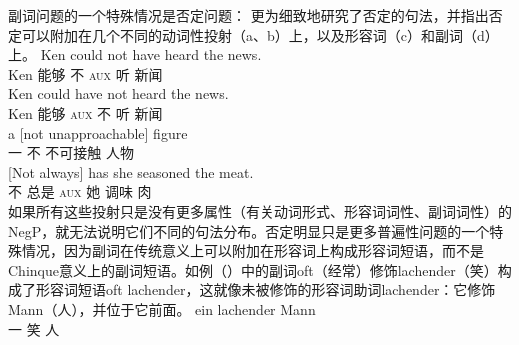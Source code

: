 副词问题的一个特殊情况是否定问题： \citet{Ernst92a}更为细致地研究了否定的句法，并指出否定可以附加在几个不同的动词性投射（a、b）上，以及形容词（c）和副词（d）上。
\eal
\ex 
\gll Ken could not have heard the news.\\
Ken 能够 不 \textsc{aux} 听  新闻\\
\ex 
\gll Ken could have not heard the news.\\
Ken 能够 \textsc{aux} 不 听  新闻\\
\ex 
\gll a [not unapproachable] figure\\
一 \spacebr{}不 不可接触 人物\\
\ex 
\gll {}[Not always] has she seasoned the meat.\\
{}\spacebr{}不 总是 \textsc{aux} 她 调味  肉\\
\zl
如果所有这些投射只是没有更多属性（有关动词形式、形容词词性、副词词性）的NegP，就无法说明它们不同的句法分布。否定明显只是更多普遍性问题的一个特殊情况，因为副词在传统意义上可以附加在形容词上构成形容词短语，而不是Chinque意义上的副词短语。如例（）中的副词oft（经常）修饰lachender（笑）构成了形容词短语oft lachender，这就像未被修饰的形容词助词lachender：它修饰Mann（人），并位于它前面。
\eal
\ex
\gll ein lachender Mann\\
     一 笑 人\\
